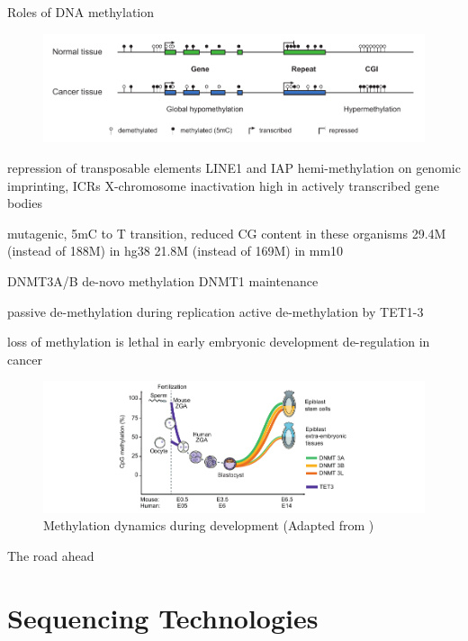 Roles of DNA methylation \cite{Greenberg2019}

\begin{figure}[h]
	\centering
	\includegraphics[width=1.0\textwidth]{figures/intro/cancer.pdf}
	\captionsetup{format=plain}
	\caption[DNA methylation in cancer]{}
	\label{fig:intro:cancer}
\end{figure}

repression of transposable elements LINE1 and IAP
hemi-methylation on genomic imprinting, ICRs
X-chromosome inactivation
high in actively transcribed gene bodies

mutagenic, 5mC to T transition, reduced CG content in these organisms
29.4M (instead of 188M) in hg38
21.8M (instead of 169M) in mm10

DNMT3A/B de-novo methylation
DNMT1 maintenance

passive de-methylation during replication
active de-methylation by TET1-3

loss of methylation is lethal in early embryonic development
de-regulation in cancer


\begin{figure}[h]
	\centering
	\includegraphics[width=1.0\textwidth]{figures/intro/methylation.pdf}
	\captionsetup{format=plain}
	\caption[DNA methylation dynamics]{Methylation dynamics during development (Adapted from \cite{Greenberg2019})}
	\label{fig:intro:methylation}
\end{figure}

The road ahead \cite{McGuire2020}




\section{Sequencing Technologies}
\label{sec:intro:sequencing}

